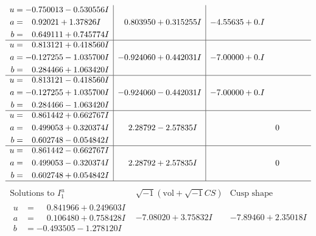 \documentclass[1p]{elsarticle_modified}
\theoremstyle{definition}
\newcommand{\I}{\sqrt{-1}}
\begin{document}
$$\begin{array}{c|c|c}
\begin{aligned}
u &= -0.750013 - 0.530556 I \\
a &= \phantom{-}0.92021 + 1.37826 I \\
b &= \phantom{-}0.649111 + 0.745774 I\end{aligned}
 & \phantom{-}0.803950 + 0.315255 I & -4.55635 + 0. I\phantom{ +0.000000I} \\ \hline\begin{aligned}
u &= \phantom{-}0.813121 + 0.418560 I \\
a &= -0.127255 - 1.035700 I \\
b &= \phantom{-}0.284466 + 1.063420 I\end{aligned}
 & -0.924060 + 0.442031 I & -7.00000 + 0. I\phantom{ +0.000000I} \\ \hline\begin{aligned}
u &= \phantom{-}0.813121 - 0.418560 I \\
a &= -0.127255 + 1.035700 I \\
b &= \phantom{-}0.284466 - 1.063420 I\end{aligned}
 & -0.924060 - 0.442031 I & -7.00000 + 0. I\phantom{ +0.000000I} \\ \hline\begin{aligned}
u &= \phantom{-}0.861442 + 0.662767 I \\
a &= \phantom{-}0.499053 + 0.320374 I \\
b &= \phantom{-}0.602748 - 0.054842 I\end{aligned}
 & \phantom{-}2.28792 - 2.57835 I & \phantom{-0.000000 } 0 \\ \hline\begin{aligned}
u &= \phantom{-}0.861442 - 0.662767 I \\
a &= \phantom{-}0.499053 - 0.320374 I \\
b &= \phantom{-}0.602748 + 0.054842 I\end{aligned}
 & \phantom{-}2.28792 + 2.57835 I & \phantom{-0.000000 } 0\\
 \hline 
 \end{array}$$\newpage$$\begin{array}{c|c|c}  
\text{Solutions to }I^u_{1}& \I (\text{vol} + \sqrt{-1}CS) & \text{Cusp shape}\\
 \hline 
\begin{aligned}
u &= \phantom{-}0.841966 + 0.249603 I \\
a &= \phantom{-}0.106480 + 0.758428 I \\
b &= -0.493505 - 1.278120 I\end{aligned}
 & -7.08020 + 3.75832 I & -7.89460 + 2.35018 I \\ \hline\begin{aligned}

\end{aligned}
\end{array}$$
\end{document}
